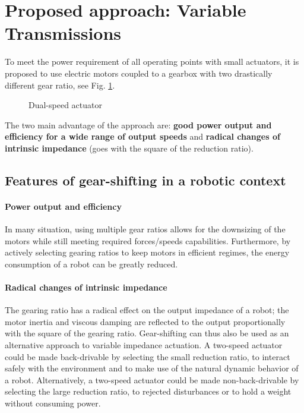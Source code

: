 \section{Proposed approach: Variable Transmissions}
\label{sec:ProposedSolutionRobotsUsingMultipleGearRatioActuators}


To meet the power requirement of all operating points with small actuators, it is proposed to use electric motors coupled to a gearbox with two drastically different gear ratio, see Fig. \ref{fig:2s}. 

\begin{figure}[htb]
        \centering
        \caption{Dual-speed actuator}\label{fig:2s}
\end{figure}


The two main advantage of the approach are: \textbf{good power output and efficiency for a wide range of output speeds} and \textbf{radical changes of intrinsic impedance} (goes with the square of the reduction ratio). 

\subsection{Features of gear-shifting in a robotic context}

\paragraph{Power output and efficiency}
In many situation, using multiple gear ratios allows for the downsizing of the motors while still meeting required forces/speeds capabilities. Furthermore, by actively selecting gearing ratios to keep motors in efficient regimes, the energy consumption of a robot can be greatly reduced. 

\paragraph{Radical changes of intrinsic impedance}
The gearing ratio has a radical effect on the output impedance of a robot; the motor inertia and viscous damping are reflected to the output proportionally with the square of the gearing ratio. Gear-shifting can thus also be used as an alternative approach to variable impedance actuation. A two-speed actuator could be made back-drivable by selecting the small reduction ratio, to interact safely with the environment and to make use of the natural dynamic behavior of a robot.  Alternatively, a two-speed actuator could be made non-back-drivable by selecting the large reduction ratio, to rejected disturbances or to hold a weight without consuming power.


